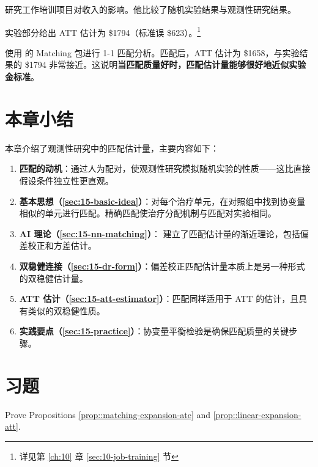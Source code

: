\citet{LaLonde:1986} 研究工作培训项目对收入的影响。他比较了随机实验结果与观测性研究结果。

实验部分给出 ATT 估计为 \$1794（标准误 \$623）。\footnote{详见第 \ref{ch:10} 章 \ref{sec:10-job-training} 节}

使用 \citet{Sekhon:2011} 的 Matching 包进行 1-1 匹配分析。匹配后，ATT 估计为 \$1658，与实验结果的 \$1794 非常接近。这说明\textbf{当匹配质量好时，匹配估计量能够很好地近似实验金标准}。

\section{本章小结}\label{sec:15-summary}

本章介绍了观测性研究中的匹配估计量，主要内容如下：

\begin{enumerate}
  \item \textbf{匹配的动机}：通过人为配对，使观测性研究模拟随机实验的性质——这比直接假设条件独立性更直观。
  \item \textbf{基本思想（\cref{sec:15-basic-idea}）}：对每个治疗单元，在对照组中找到协变量相似的单元进行匹配。精确匹配使治疗分配机制与匹配对实验相同。
  \item \textbf{AI 理论（\cref{sec:15-nn-matching}）}：\citet{AbadieImbens:2006,AbadieImbens:2008,AbadieImbens:2011} 建立了匹配估计量的渐近理论，包括偏差校正和方差估计。
  \item \textbf{双稳健连接（\cref{sec:15-dr-form}）}：偏差校正匹配估计量本质上是另一种形式的双稳健估计量。
  \item \textbf{ATT 估计（\cref{sec:15-att-estimator}）}：匹配同样适用于 ATT 的估计，且具有类似的双稳健性质。
  \item \textbf{实践要点（\cref{sec:15-practice}）}：协变量平衡检验是确保匹配质量的关键步骤。
\end{enumerate}

\section{习题}\label{sec:15-homework}

\begin{HomeworkProblem}\label{exr:15-1}


 Prove Propositions \ref{prop::matching-expansion-ate} and \ref{prop::linear-expansion-att}.



\end{HomeworkProblem}

